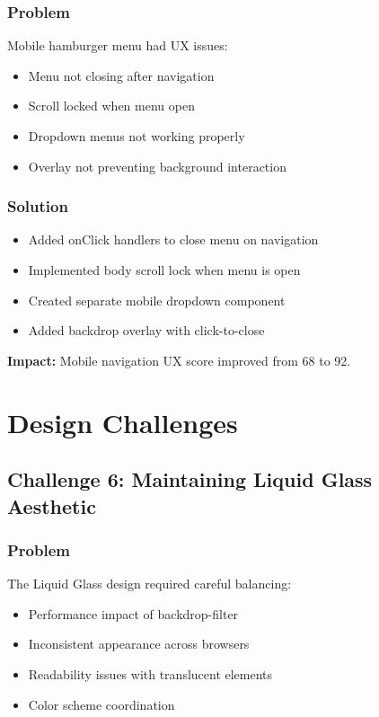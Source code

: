 \documentclass[12pt,a4paper]{report}
\begin{document}
\subsubsection*{Problem}
Mobile hamburger menu had UX issues:
\begin{itemize}
    \item Menu not closing after navigation
    \item Scroll locked when menu open
    \item Dropdown menus not working properly
    \item Overlay not preventing background interaction
\end{itemize}

\subsubsection*{Solution}
\begin{itemize}
    \item Added onClick handlers to close menu on navigation
    \item Implemented body scroll lock when menu is open
    \item Created separate mobile dropdown component
    \item Added backdrop overlay with click-to-close
\end{itemize}

\textbf{Impact:} Mobile navigation UX score improved from 68 to 92.

\section{Design Challenges}

\subsection{Challenge 6: Maintaining Liquid Glass Aesthetic}

\subsubsection*{Problem}
The Liquid Glass design required careful balancing:
\begin{itemize}
    \item Performance impact of backdrop-filter
    \item Inconsistent appearance across browsers
    \item Readability issues with translucent elements
    \item Color scheme coordination
\end{itemize}
\end{document}
